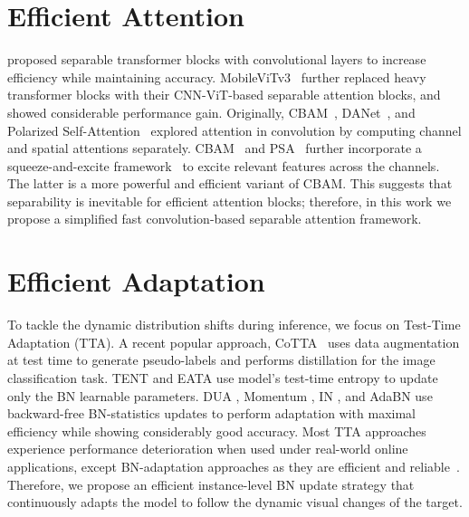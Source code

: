 \section{Efficient Attention}
\cite{mehta2022separable} proposed separable transformer blocks with convolutional layers to increase efficiency while maintaining accuracy. MobileViTv3~\cite{wadekar2022mobilevitv3} further replaced heavy transformer blocks with their CNN-ViT-based separable attention blocks, and showed considerable performance gain. Originally, CBAM~\cite{woo2018cbam}, DANet~\cite{fu2019dual}, and Polarized Self-Attention~\cite{liu2021polarized} explored attention in convolution by computing channel and spatial attentions separately. CBAM~\cite{woo2018cbam} and PSA~\cite{liu2021polarized} further incorporate a squeeze-and-excite framework~\cite{iandola2016squeezenet} to excite relevant features across the channels. The latter is a more powerful and efficient variant of CBAM.
This suggests that separability is inevitable for efficient attention blocks; therefore, in this work we propose a simplified fast convolution-based separable attention framework.

\section{Efficient Adaptation}
To tackle the dynamic distribution shifts during inference, we focus on Test-Time Adaptation (TTA). A recent popular approach, CoTTA~\cite{wang2022continual} uses data augmentation at test time to generate pseudo-labels and performs distillation for the image classification task. TENT \cite{wang2020tent} and EATA \cite{niu2022efficient} use model's test-time entropy to update only the BN learnable parameters. DUA \cite{mirza2022norm}, Momentum \cite{schneider2020improving}, IN \cite{pan2018two}, and AdaBN \cite{li2016revisiting} use backward-free BN-statistics updates to perform adaptation with maximal efficiency while showing considerably good accuracy. Most TTA approaches experience performance deterioration when used under real-world online applications, except BN-adaptation approaches as they are efficient and reliable~\cite{alfarra2023revisiting}. Therefore, we propose an efficient instance-level BN update strategy that continuously adapts the model to follow the dynamic visual changes of the target.
